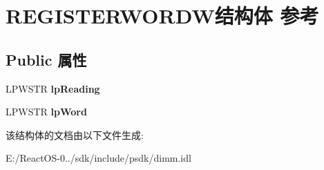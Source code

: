 \hypertarget{struct_r_e_g_i_s_t_e_r_w_o_r_d_w}{}\section{R\+E\+G\+I\+S\+T\+E\+R\+W\+O\+R\+D\+W结构体 参考}
\label{struct_r_e_g_i_s_t_e_r_w_o_r_d_w}
\subsection*{Public 属性}
\begin{DoxyCompactItemize}
\item 
\mbox{\label{struct_r_e_g_i_s_t_e_r_w_o_r_d_w_adaf6034d00f9acc140d45bb095c53ea6}} 
L\+P\+W\+S\+TR {\bfseries lp\+Reading}
\item 
\mbox{\label{struct_r_e_g_i_s_t_e_r_w_o_r_d_w_ad11e6cf83f59d7a741e6eee684a77d3f}} 
L\+P\+W\+S\+TR {\bfseries lp\+Word}
\end{DoxyCompactItemize}


该结构体的文档由以下文件生成\+:\begin{DoxyCompactItemize}
\item 
E\+:/\+React\+O\+S-\/0../sdk/include/psdk/dimm.\+idl\end{DoxyCompactItemize}
